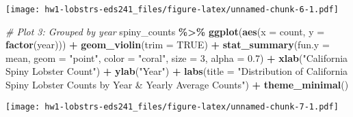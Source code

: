 \documentclass[
]{article}
\newenvironment{Shaded}{\begin{snugshade}}{\end{snugshade}}
\newcommand{\AttributeTok}[1]{\textcolor[rgb]{0.13,0.29,0.53}{#1}}
\newcommand{\CommentTok}[1]{\textcolor[rgb]{0.56,0.35,0.01}{\textit{#1}}}
\newcommand{\ConstantTok}[1]{\textcolor[rgb]{0.56,0.35,0.01}{#1}}
\newcommand{\DecValTok}[1]{\textcolor[rgb]{0.00,0.00,0.81}{#1}}
\newcommand{\FloatTok}[1]{\textcolor[rgb]{0.00,0.00,0.81}{#1}}
\newcommand{\FunctionTok}[1]{\textcolor[rgb]{0.13,0.29,0.53}{\textbf{#1}}}
\newcommand{\NormalTok}[1]{#1}
\newcommand{\SpecialCharTok}[1]{\textcolor[rgb]{0.81,0.36,0.00}{\textbf{#1}}}
\newcommand{\StringTok}[1]{\textcolor[rgb]{0.31,0.60,0.02}{#1}}
\begin{document}
\texttt{[image: hw1-lobstrs-eds241\_files/figure-latex/unnamed-chunk-6-1.pdf]}

\begin{Shaded}
\begin{Highlighting}[]
\CommentTok{\# Plot 3: Grouped by year}
\NormalTok{spiny\_counts }\SpecialCharTok{\%\textgreater{}\%} 
    \FunctionTok{ggplot}\NormalTok{(}\FunctionTok{aes}\NormalTok{(}\AttributeTok{x =}\NormalTok{ count, }\AttributeTok{y =} \FunctionTok{factor}\NormalTok{(year))) }\SpecialCharTok{+}
    \FunctionTok{geom\_violin}\NormalTok{(}\AttributeTok{trim =} \ConstantTok{TRUE}\NormalTok{) }\SpecialCharTok{+}
    \FunctionTok{stat\_summary}\NormalTok{(}\AttributeTok{fun.y =}\NormalTok{ mean, }\AttributeTok{geom =} \StringTok{"point"}\NormalTok{, }\AttributeTok{color =} \StringTok{"coral"}\NormalTok{, }\AttributeTok{size =} \DecValTok{3}\NormalTok{, }\AttributeTok{alpha =} \FloatTok{0.7}\NormalTok{)  }\SpecialCharTok{+}
    \FunctionTok{xlab}\NormalTok{(}\StringTok{"California Spiny Lobster Count"}\NormalTok{) }\SpecialCharTok{+}
    \FunctionTok{ylab}\NormalTok{(}\StringTok{"Year"}\NormalTok{) }\SpecialCharTok{+}
    \FunctionTok{labs}\NormalTok{(}\AttributeTok{title =} \StringTok{"Distribution of California Spiny Lobster Counts by Year \& Yearly Average Counts"}\NormalTok{) }\SpecialCharTok{+}
    \FunctionTok{theme\_minimal}\NormalTok{()}
\end{Highlighting}
\end{Shaded}

\texttt{[image: hw1-lobstrs-eds241\_files/figure-latex/unnamed-chunk-7-1.pdf]}
\end{document}
